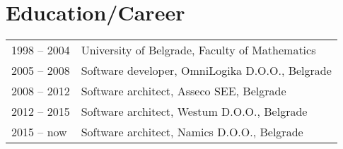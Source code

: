 \section*{Education/Career}
\begin{longtable}{@{}p{6cm}p{10cm}}
1998 – 2004 	& University of Belgrade, Faculty of Mathematics\\
2005 – 2008 	& Software developer, OmniLogika D.O.O., Belgrade\\
2008 – 2012 	& Software architect, Asseco SEE, Belgrade\\
2012 – 2015  	& Software architect, Westum D.O.O., Belgrade\\
2015 – now  	& Software architect, Namics D.O.O., Belgrade
\end{longtable}

